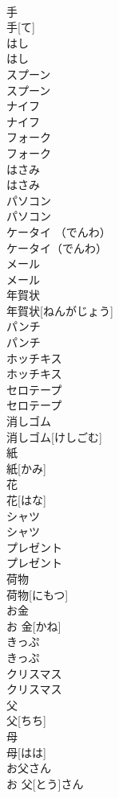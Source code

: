 \documentclass[8pt]{extreport}
\begin{document}
\begin{CJK}{UTF8}{min}
\\	手	
\\	手[て]	
\\	はし	
\\	はし	
\\	スプーン	
\\	スプーン	
\\	ナイフ	
\\	ナイフ	
\\	フォーク	
\\	フォーク	
\\	はさみ	
\\	はさみ	
\\	パソコン	
\\	パソコン	
\\	ケータイ （でんわ）	
\\	ケータイ（でんわ）	
\\	メール	
\\	メール	
\\	年賀状	
\\	年賀状[ねんがじょう]	
\\	パンチ	
\\	パンチ	
\\	ホッチキス	
\\	ホッチキス	
\\	セロテープ	
\\	セロテープ	
\\	消しゴム	
\\	消しゴム[けしごむ]	
\\	紙	
\\	紙[かみ]	
\\	花	
\\	花[はな]	
\\	シャツ	
\\	シャツ	
\\	プレゼント	
\\	プレゼント	
\\	荷物	
\\	荷物[にもつ]	
\\	お金	
\\	お 金[かね]	
\\	きっぷ	
\\	きっぷ	
\\	クリスマス	
\\	クリスマス	
\\	父	
\\	父[ちち]	
\\	母	
\\	母[はは]	
\\	お父さん	
\\	お 父[とう]さん	

\end{CJK}
\end{document}
